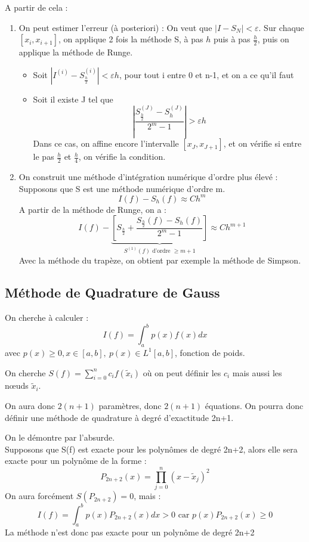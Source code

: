 A partir de cela :
\begin{enumerate}
	\item On peut estimer l'erreur (à posteriori) : On veut que $|I-S_N|<\varepsilon$. Sur chaque $[x_i,x_{i+1}]$, on applique 2 fois la méthode S, à pas $h$ puis à pas $\frac{h}{2}$, puis on applique la méthode de Runge.
		\begin{itemize}
			\item Soit $|I^{(i)}-S_{\frac{h}{2}}^{(i)}| <\varepsilon h$, pour tout i entre 0 et n-1, et on a ce qu'il faut
			\item Soit il existe J tel que \[\left| \frac{S_{\frac{h}{2}}^{(J)}-S_h^{(J)}}{2^m-1}\right|>\varepsilon h\]
				Dans ce cas, on affine encore l'intervalle $[x_J,x_{J+1}]$, et on vérifie si entre le pas $\frac{h}{2}$ et $\frac{h}{4}$, on vérifie la condition.
		\end{itemize}
	\item On construit une méthode d'intégration numérique d'ordre plus élevé : \\
		Supposons que S est une méthode numérique d'ordre m. \[I(f)-S_h(f)\approx Ch^m\]
		A partir de la méthode de Runge, on a :
		\[I(f) - \underbrace{\left[S_{\frac{h}{2}}+\frac{S_{\frac{h}{2}}(f)-S_h(f)}{2^m-1}\right]}_{S^{(1)}(f) \text{ d'ordre } \geq m+1} \approx Ch^{m+1}\]
		Avec la méthode du trapèze, on obtient par exemple la méthode de Simpson.
\end{enumerate}

\subsection{Méthode de Quadrature de Gauss}
On cherche à calculer :
\[I(f)=\int_a^b p(x)f(x)dx\]
avec $p(x)\geq 0, x\in[a,b],\ p(x)\in L^1[a,b]$, fonction de poids.

On cherche $S(f)=\sum_{i=0}^n c_if(\tilde{x}_i)$ où on peut définir les $c_i$ mais aussi les nœuds $\tilde{x}_i$.

On aura donc $2(n+1)$ paramètres, donc $2(n+1)$ équations. On pourra donc définir une méthode de quadrature à degré d'exactitude 2n+1.


\begin{dem}
On le démontre par l'absurde. \\
Supposons que S(f) est exacte pour les polynômes de degré 2n+2, alors elle sera exacte pour un polynôme de la forme :
\[P_{2n+2}(x)=\prod_{j=0}^n (x-\tilde{x}_j)^2\]
On aura forcément $S(P_{2n+2})=0$, mais : 
\[I(f)=\int_a^b p(x)P_{2n+2}(x)dx >0 \text{ car } p(x)P_{2n+2}(x) \geq 0\]
La méthode n'est donc pas exacte pour un polynôme de degré 2n+2
\end{dem}

